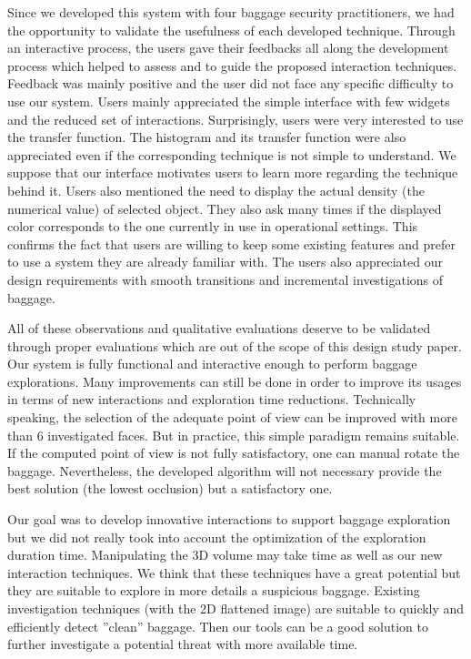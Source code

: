 Since we developed this system with four baggage security practitioners, we had the opportunity to validate the usefulness of each developed technique. Through an interactive process, the users gave their feedbacks all along the development process which helped to assess and to guide the proposed interaction techniques. Feedback was mainly positive and the user did not face any specific difficulty to use our system. Users mainly appreciated the simple interface with few widgets and the reduced set of interactions. Surprisingly, users were very interested to use the transfer function. The histogram and its transfer function were also appreciated even if the corresponding technique is not simple to understand. We suppose that our interface motivates users to learn more regarding the technique behind it. Users also mentioned the need to display the actual density (the numerical value) of selected object. They also ask many times if the displayed color corresponds to the one currently in use in operational settings. This confirms the fact that users are willing to keep some existing features and prefer to use a system they are already familiar with.
The users also appreciated our design requirements with smooth transitions and incremental investigations of baggage.
\par All of these observations and qualitative evaluations deserve to be validated through proper evaluations which are out of the scope of this design study paper.
Our system is fully functional and interactive enough to perform baggage explorations. Many improvements can still be done in order to improve its usages in terms of new interactions and exploration time reductions.
Technically speaking, the selection of the adequate point of view can be improved with more than 6 investigated faces. But in practice, this simple paradigm remains suitable. If the computed point of view is not fully satisfactory, one can manual rotate the baggage. Nevertheless, the developed algorithm will not necessary provide the best solution (the lowest occlusion) but a satisfactory one.
\par Our goal was to develop
innovative interactions to support baggage exploration but we did not really took into account the optimization of the exploration duration time. Manipulating the 3D volume may take time as well as our new interaction techniques. We think that these techniques have a great potential but they are suitable to explore in more details a suspicious baggage. Existing investigation techniques (with the 2D flattened image) are suitable to quickly and efficiently detect ''clean'' baggage. Then our tools can be a good solution to further investigate a potential threat with more available time.